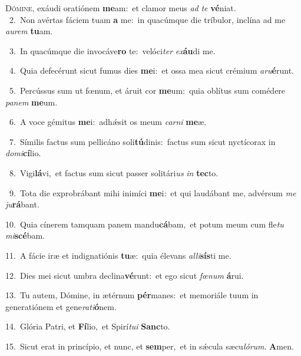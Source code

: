 \lettrine{\initial\textcolor{\initialcolor}{D}}{ómine,} exáudi oratiónem \textbf{me}\-am:~\star et clamor meus \textit{ad} \textit{te} \textbf{vé}\-niat.\\
{\numbfont\textcolor{\numbcolor}{~2.}}~Non avértas fáciem tuam \textbf{a} me:~\star in quacúmque die tríbulor, inclína ad me \textit{au}\-\textit{rem} \textbf{tu}\-am.\par
{\numbfont\textcolor{\numbcolor}{~3.}}~In quacúmque die invocáve\textbf{ro} te:~\star velóci\textit{ter} \textit{ex}\-\textbf{áu}di me.\par
{\numbfont\textcolor{\numbcolor}{~4.}}~Quia defecérunt sicut fumus dies \textbf{me}\-i:~\star et ossa mea sicut crémium \textit{a}\-\textit{ru}\textbf{é}runt.\par
{\numbfont\textcolor{\numbcolor}{~5.}}~Percússus sum ut fœnum, et áruit cor \textbf{me}\-um:~\star quia oblítus sum comédere \textit{pa}\-\textit{nem} \textbf{me}\-um.\par
{\numbfont\textcolor{\numbcolor}{~6.}}~A voce gémitus \textbf{me}\-i:~\star adhǽsit os meum \textit{car}\-\textit{ni} \textbf{me}\-æ.\par
{\numbfont\textcolor{\numbcolor}{~7.}}~Símilis factus sum pellicáno soli\-\textbf{tú}\-dinis:~\star factus sum sicut nyctícorax in \textit{do}\-\textit{mi}\textbf{cí}lio.\par
{\numbfont\textcolor{\numbcolor}{~8.}}~Vigi\-\textbf{lá}\-vi,~\star et factus sum sicut passer solitári\textit{us} \textit{in} \textbf{tec}\-to.\par
{\numbfont\textcolor{\numbcolor}{~9.}}~Tota die exprobrábant mihi inimíci \textbf{me}\-i:~\star et qui laudábant me, advérsum \textit{me} \textit{ju}\-\textbf{rá}bant.\par
{\numbfont\textcolor{\numbcolor}{10.}}~Quia cínerem tamquam panem mandu\-\textbf{cá}\-bam,~\star et potum meum cum fle\textit{tu} \textit{mi}\-\textbf{scé}bam.\par
{\numbfont\textcolor{\numbcolor}{11.}}~A fácie iræ et indignatiónis \textbf{tu}\-æ:~\star quia élevans \textit{al}\-\textit{li}\textbf{sís}ti me.\par
{\numbfont\textcolor{\numbcolor}{12.}}~Dies mei sicut umbra declina\-\textbf{vé}\-runt:~\star et ego sicut \textit{fœ}\-\textit{num} \textbf{á}\-rui.\par
{\numbfont\textcolor{\numbcolor}{13.}}~Tu autem, Dómine, in ætérnum \textbf{pér}\-manes:~\star et memoriále tuum in generatiónem et gene\-\textit{ra}\-\textit{ti}\textbf{ó}nem.\par
{\numbfont\textcolor{\numbcolor}{14.}}~Glória Patri, et \textbf{Fí}\-lio,~\star et Spirí\-\textit{tu}\-\textit{i} \textbf{Sanc}\-to.\par
{\numbfont\textcolor{\numbcolor}{15.}}~Sicut erat in princípio, et nunc, et \textbf{sem}\-per,~\star et in sǽcula sæcu\-\textit{ló}\-\textit{rum}. \textbf{A}\-men.\par
